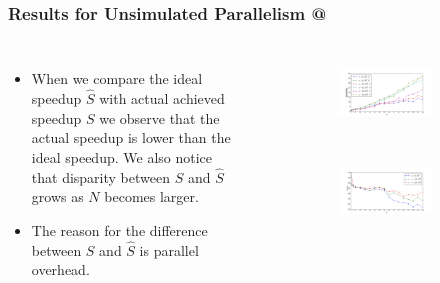 \documentclass[9pt]{beamer}
\makeatletter
\newcommand*{\rom}[1]{\expandafter\@slowromancap\romannumeral #1@}
\makeatother
\begin{document}
\begin{frame}
\frametitle{Results for Unsimulated Parallelism \rom{2}}
\begin{columns}
\begin{itemize}
\item{When we compare the ideal speedup $\hat S$ with actual achieved speedup $S$ we observe that the actual speedup is lower than the ideal speedup. We also notice that disparity between $S$ and $\hat S$ grows as $N$ becomes larger.}
\item{The reason for the difference between $S$ and $\hat S$ is parallel overhead.}
\end{itemize}
\begin{figure}
\centering
\begin{subfigure}{1\linewidth}
\centering
\includegraphics[scale=0.2]{SS.png}
\end{subfigure}
\\
\begin{subfigure}{1\linewidth}
\includegraphics[scale=0.2]{SS2.png}
\end{subfigure}
\end{figure}
\end{columns}
\end{frame}

\end{document}
